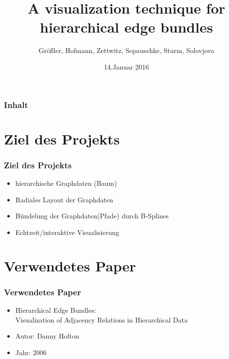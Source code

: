 \documentclass[11pt]{beamer}
\author{Größler, Hofmann, Zettwitz, Sopauschke, Sturm, Solovjova}
\title{A visualization technique for \\  hierarchical edge bundles}
\date{14.Januar 2016}
\begin{document}
\begin{frame}
\titlepage
\end{frame}

\begin{frame}
\frametitle{Inhalt} 
\tableofcontents
\end{frame}


\section{Ziel des Projekts}
\begin{frame}
\frametitle{Ziel des Projekts}
\begin{itemize} 
\item hierarchische Graphdaten (Baum)
\item Radiales Layout der Graphdaten
\item Bündelung der Graphdaten(Pfade) durch B-Splines
\item Echtzeit/interaktive Visualisierung
\end{itemize}
\end{frame}

\section{Verwendetes Paper}
\begin{frame}[allowframebreaks]
\frametitle{Verwendetes Paper}
\begin{itemize} 
\item Hierarchical Edge Bundles: \\
Visualization of Adjacency Relations in Hierarchical Data
\item Autor: Danny Holton
\item Jahr: 2006
\end{itemize}
\end{frame}
\end{document}
